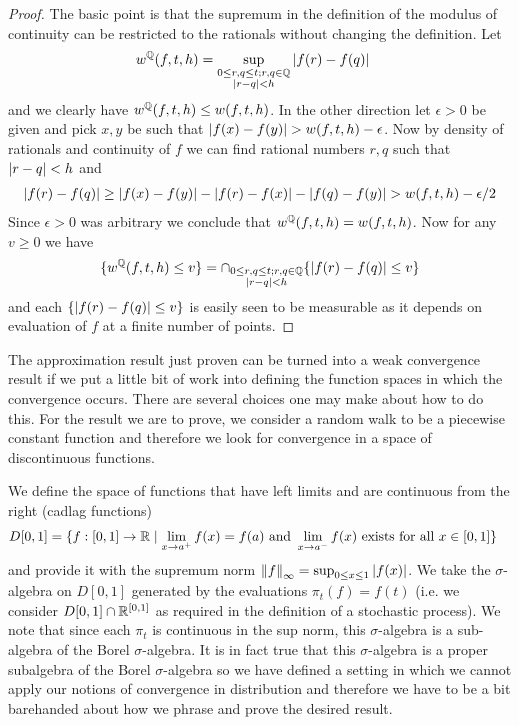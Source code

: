 \begin{proof}
The basic point is that the supremum in the definition of the modulus
of continuity can be restricted to the rationals without changing the
definition.  Let 
\begin{align*}
w^{\mathbb{Q}}(f,t,h) &= \sup_{\substack{0 \leq r,q \leq t; r,q \in
    \mathbb{Q} \\ \left \vert r - q \right \vert < h}} \left \vert f(r) - f(q) \right \vert
\end{align*}
and we clearly have $w^{\mathbb{Q}}(f,t,h) \leq w(f,t,h)$.  In the
other direction let $\epsilon > 0$ be given and pick $x,y$ be such
that $\left \vert f(x) - f(y) \right \vert > w(f,t,h) - \epsilon$.  Now by density of
rationals and continuity of $f$ we can find rational numbers $r,q$
such that $\left \vert r-q \right \vert < h$ and 
\begin{align*}
\left \vert f(r) - f(q) \right \vert \geq \left \vert f(x) -
  f(y) \right \vert - \left \vert f(r) - f(x) \right \vert - \left \vert f(q)-f(y) \right \vert > w(f,t,h) - \epsilon/2
\end{align*}
Since $\epsilon>0$ was arbitrary we conclude that
$w^{\mathbb{Q}}(f,t,h) = w(f,t,h)$.
Now for any $v \geq 0$ we have 
\begin{align*}
\lbrace w^{\mathbb{Q}}(f,t,h) \leq v \rbrace = \cap_{\substack{0 \leq r,q \leq t; r,q \in
    \mathbb{Q} \\ \left \vert r - q \right \vert < h}} \lbrace \left \vert f(r) - f(q) \right \vert \leq v \rbrace
\end{align*}
and each $\lbrace \left \vert f(r) - f(q) \right \vert \leq v \rbrace$ is easily seen to
be measurable as it depends on evaluation of $f$ at a finite number of points.
\end{proof}

The approximation result just proven can be turned into a weak convergence
result if we put a little bit of work into defining the function
spaces in which the convergence occurs.  There are several choices one
may make about how to do this.  For the result we are to prove, we
consider a random walk to be a piecewise constant function and
therefore we look for convergence in a space of discontinuous
functions.

We define the space of functions that have left limits and are
continuous from the right (cadlag functions)
\begin{align*}
D[0,1] &= \lbrace f: [0,1] \to \mathbb{R} \mid \lim_{x \to a^+} f(x) = f(a)
\text{ and } \lim_{x \to a^-} f(x) \text{ exists for all $x \in [0,1]$} \rbrace
\end{align*}
and provide it with the supremum norm $\left \lVert f \right \rVert_\infty = \sup_{0 \leq x \leq
  1} \left \vert f(x) \right \vert$. We take the $\sigma$-algebra on $D[0,1]$ generated
by the evaluations $\pi_t(f) = f(t)$ (i.e. we consider $D[0,1] \cap
\mathbb{R}^{[0,1]}$ as required in the definition of a stochastic
process).  We note that since each $\pi_t$ is continuous in the sup
norm, this $\sigma$-algebra is a sub-algebra of the Borel
$\sigma$-algebra.  It is in fact true that this $\sigma$-algebra is a
proper subalgebra of the Borel $\sigma$-algebra so we have defined a
setting in which we cannot apply our notions of convergence in
distribution and therefore we have to be a bit barehanded about how we
phrase and prove the desired result.

